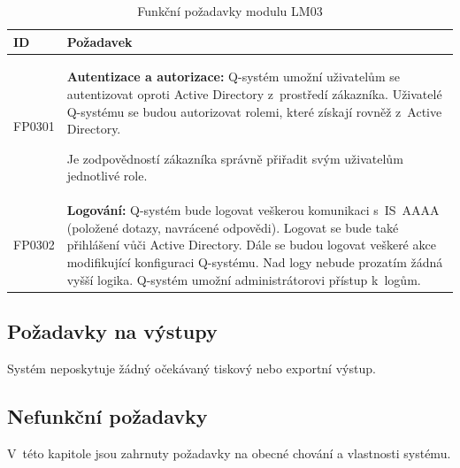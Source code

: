 \documentclass[thesis=M,czech]{FITthesis}[2019/12/23]
\begin{document}
\begin{table}[H]
	\centering
	\begin{tabular}{|p{}|p{}|}
		\hline
  		{\textbf{ID}} & {\textbf{Požadavek}} \\
  		\hline \hline
  		FP0301 & \textbf{Autentizace a autorizace:} Q-systém umožní uživatelům se autentizovat oproti Active Directory z~prostředí zákazníka. Uživatelé Q-systému se budou autorizovat rolemi, které získají rovněž z~Active Directory.

Je zodpovědností zákazníka správně přiřadit svým uživatelům jednotlivé role. \\ \hline
		FP0302 & \textbf{Logování:} Q-systém bude logovat veškerou komunikaci s~IS~AAAA (položené dotazy, navrácené odpovědi). Logovat se bude také přihlášení vůči Active Directory. Dále se budou logovat veškeré akce modifikující konfiguraci Q-systému. Nad logy nebude prozatím žádná vyšší logika. Q-systém umožní administrátorovi přístup k~logům. \\ \hline
	\end{tabular}
 	\caption{Funkční požadavky modulu LM03}
\label{tab:Funkční požadavky modulu LM03}
\end{table}

\newpage
\subsection{Požadavky na výstupy}
Systém neposkytuje žádný očekávaný tiskový nebo exportní výstup.

\subsection{Nefunkční požadavky}
V~této kapitole jsou zahrnuty požadavky na obecné chování a vlastnosti systému.
\end{document}
